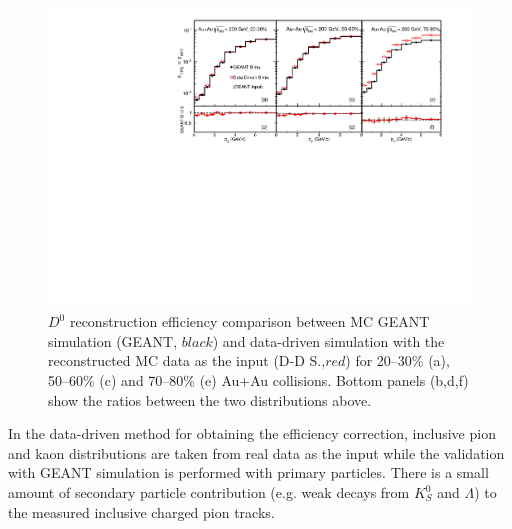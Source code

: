 \documentclass[%
 reprint,	
 amsmath,amssymb,
 aps,
 prc,
]{revtex4-1}
\begin{document}
\begin{figure}
\centering
\includegraphics[width=1.05\textwidth]{fig/Mcd0Eff_20_80.pdf}
  \caption{$D^{0}$ reconstruction efficiency comparison between MC GEANT simulation (GEANT, $black$) and  data-driven simulation with the reconstructed MC data as the input (D-D S.,$red$) for 20--30\% (a), 50--60\% (c) and 70--80\% (e) Au+Au collisions. Bottom panels (b,d,f) show the ratios between the two distributions above.}
\label{fig:Mcd0Eff_20_80} 
\end{figure}

In the data-driven method for obtaining the efficiency correction, inclusive pion and kaon distributions are taken from real data as the input while the validation with GEANT simulation is performed with primary particles. There is a small amount of secondary particle contribution (e.g. weak decays from $K^0_S$ and $\Lambda$) to the measured inclusive charged pion tracks.
\end{document}
